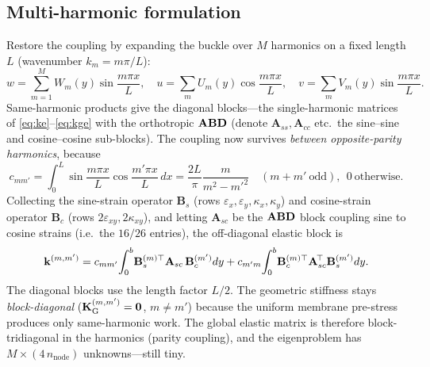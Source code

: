 \subsection{Multi-harmonic formulation}\label{sec:multi}
Restore the coupling by expanding the buckle over $M$ harmonics on a fixed length $L$ (wavenumber
$k_m=m\pi/L$):
\begin{equation}
w=\sum_{m=1}^{M}W_m(y)\sin\frac{m\pi x}{L},\quad
u=\sum_{m}U_m(y)\cos\frac{m\pi x}{L},\quad v=\sum_m V_m(y)\sin\frac{m\pi x}{L}.
\label{eq:series}
\end{equation}
Same-harmonic products give the diagonal blocks---the single-harmonic matrices of \eqref{eq:ke}--\eqref{eq:kge}
with the orthotropic $\mathbf{ABD}$ (denote $\mathbf A_{ss},\mathbf A_{cc}$ etc.\ the sine--sine and cosine--cosine
sub-blocks). The coupling now survives \emph{between opposite-parity harmonics}, because
\begin{equation}
c_{mm'}=\int_0^L\sin\frac{m\pi x}{L}\cos\frac{m'\pi x}{L}\,dx
=\frac{2L}{\pi}\frac{m}{m^2-m'^2}\quad(m+m'\ \text{odd}),\ \ 0\ \text{otherwise}.
\label{eq:coupint}
\end{equation}
Collecting the sine-strain operator $\mathbf B_{s}$ (rows $\varepsilon_x,\varepsilon_y,\kappa_x,\kappa_y$)
and cosine-strain operator $\mathbf B_{c}$ (rows $2\varepsilon_{xy},2\kappa_{xy}$), and letting
$\mathbf A_{sc}$ be the $\mathbf{ABD}$ block coupling sine to cosine strains (i.e.\ the $16/26$ entries), the
off-diagonal elastic block is
\begin{equation}
\mathbf{k}^{(m,m')}=c_{mm'}\!\int_0^b\!\mathbf B_{s}^{(m)\top}\mathbf A_{sc}\,\mathbf B_{c}^{(m')}dy
+c_{m'm}\!\int_0^b\!\mathbf B_{c}^{(m)\top}\mathbf A_{sc}^{\!\top}\mathbf B_{s}^{(m')}dy .
\label{eq:kcouple}
\end{equation}
The diagonal blocks use the length factor $L/2$. The geometric stiffness stays \emph{block-diagonal}
($\mathbf{K}_{\mathrm{G}}^{(m,m')}=\bm0$, $m\neq m'$) because the uniform membrane pre-stress produces only same-harmonic work.
The global elastic matrix is therefore block-tridiagonal in the harmonics (parity coupling), and the
eigenproblem has $M\!\times\!(4\,n_{\text{node}})$ unknowns---still tiny.

